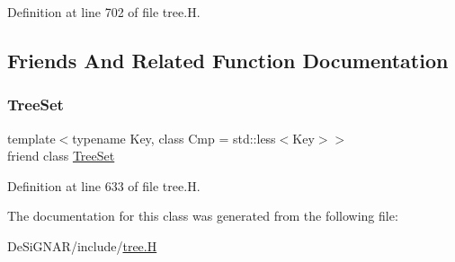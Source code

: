 Definition at line 702 of file tree.\+H.



\subsection{Friends And Related Function Documentation}
\mbox{\label{class_designar_1_1_tree_set_1_1_inorder_iterator_a7caa42294700d2a60905ec3458a7cd8a}} 
\subsubsection{\texorpdfstring{Tree\+Set}{TreeSet}}
{\footnotesize\ttfamily template$<$typename Key, class Cmp = std\+::less$<$\+Key$>$$>$ \\
friend class \hyperlink{class_designar_1_1_tree_set}{Tree\+Set}\hspace{0.3cm}{\ttfamily [friend]}}



Definition at line 633 of file tree.\+H.



The documentation for this class was generated from the following file\+:\begin{DoxyCompactItemize}
\item 
De\+Si\+G\+N\+A\+R/include/\hyperlink{tree_8_h}{tree.\+H}\end{DoxyCompactItemize}
